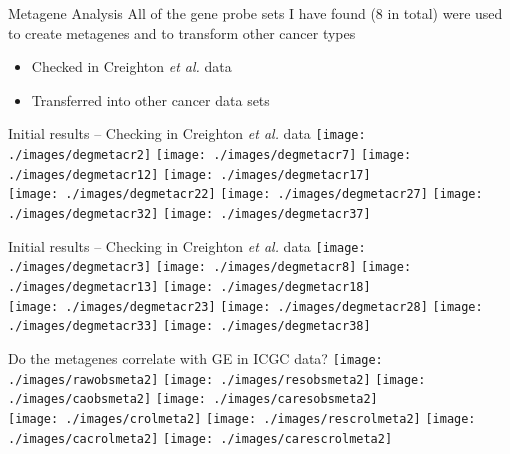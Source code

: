 \documentclass[handout]{beamer}
\begin{document}
\begin{frame}{Metagene Analysis}
	All of the gene probe sets I have found (8 in total) were used to create metagenes and to transform other cancer types
	\begin{itemize}
		\item Checked in Creighton \textit{et al.} data
		\item Transferred into other cancer data sets
	\end{itemize}
\end{frame}

\begin{frame}{Initial results -- Checking in Creighton \textit{et al.} data}
	\texttt{[image: ./images/degmetacr2]}
	\texttt{[image: ./images/degmetacr7]}
	\texttt{[image: ./images/degmetacr12]}
	\texttt{[image: ./images/degmetacr17]}\\
	\texttt{[image: ./images/degmetacr22]}
	\texttt{[image: ./images/degmetacr27]}
	\texttt{[image: ./images/degmetacr32]}
	\texttt{[image: ./images/degmetacr37]}
\end{frame}

\begin{frame}{Initial results -- Checking in Creighton \textit{et al.} data}
	\texttt{[image: ./images/degmetacr3]}
	\texttt{[image: ./images/degmetacr8]}
	\texttt{[image: ./images/degmetacr13]}
	\texttt{[image: ./images/degmetacr18]}\\
	\texttt{[image: ./images/degmetacr23]}
	\texttt{[image: ./images/degmetacr28]}
	\texttt{[image: ./images/degmetacr33]}
	\texttt{[image: ./images/degmetacr38]}
\end{frame}

\begin{frame}{Do the metagenes correlate with GE in ICGC data?}
	\texttt{[image: ./images/rawobsmeta2]}
	\texttt{[image: ./images/resobsmeta2]}
	\texttt{[image: ./images/caobsmeta2]}
	\texttt{[image: ./images/caresobsmeta2]}\\
	\texttt{[image: ./images/crolmeta2]}
	\texttt{[image: ./images/rescrolmeta2]}
	\texttt{[image: ./images/cacrolmeta2]}
	\texttt{[image: ./images/carescrolmeta2]}
\end{frame}
\end{document}

